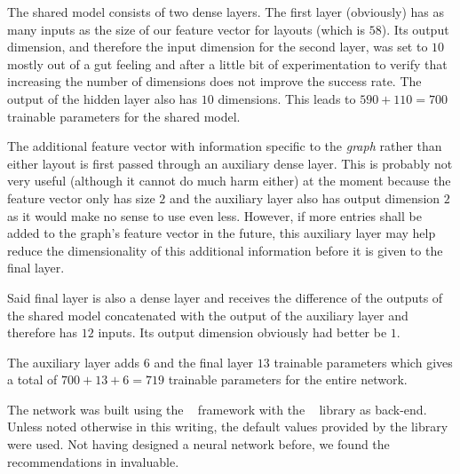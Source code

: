 \documentclass{graphstudy}
\begin{document}
The shared model consists of two dense layers.  The first layer (obviously) has as many inputs as the size of our
feature vector for layouts (which is \(58\)).  Its output dimension, and therefore the input dimension for the second
layer, was set to \(10\) mostly out of a gut feeling and after a little bit of experimentation to verify that increasing
the number of dimensions does not improve the success rate.  The output of the hidden layer also has \(10\) dimensions.
This leads to \(590+110=700\) trainable parameters for the shared model.

The additional feature vector with information specific to the \emph{graph} rather than either layout is first passed
through an auxiliary dense layer.  This is probably not very useful (although it cannot do much harm either) at the
moment because the feature vector only has size \(2\) and the auxiliary layer also has output dimension \(2\) as it
would make no sense to use even less.  However, if more entries shall be added to the graph's feature vector in the
future, this auxiliary layer may help reduce the dimensionality of this additional information before it is given to the
final layer.

Said final layer is also a dense layer and receives the difference of the outputs of the shared model concatenated with
the output of the auxiliary layer and therefore has \(12\) inputs.  Its output dimension obviously had better be \(1\).

The auxiliary layer adds \(6\) and the final layer \(13\) trainable parameters which gives a total of \(700+13+6=719\)
trainable parameters for the entire network.

The network was built using the \Keras~\cite{Keras} framework with the \TensorFlow~\cite{TensorFlow} library as
back-end.  Unless noted otherwise in this writing, the default values provided by the library were used.  Not having
designed a neural network before, we found the recommendations in \textcite{LeCun1998} invaluable.
\end{document}
